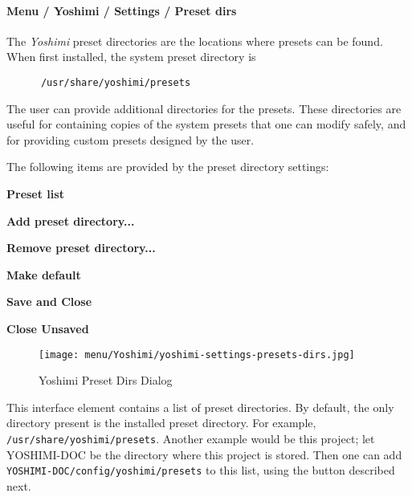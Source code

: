 \paragraph{Menu / Yoshimi / Settings / Preset dirs}
\label{paragraph:menu_yoshimi_settings_preset_dirs}

   The \textsl{Yoshimi} preset directories are the locations where
   presets can be found.  When first installed, the system
   preset directory is

   \begin{verbatim}
      /usr/share/yoshimi/presets
   \end{verbatim}
   
   The user can provide additional directories for the presets.
   These directories are useful for containing copies of the system
   presets that one can modify safely, and for providing custom
   presets designed by the user.

   The following items are provided by the preset directory settings:

   \begin{enumber}
      \item \textbf{Preset list}
      \item \textbf{Add preset directory...}
      \item \textbf{Remove preset directory...}
      \item \textbf{Make default}
      \item \textbf{Save and Close}
      \item \textbf{Close Unsaved}
   \end{enumber}

   \setcounter{ItemCounter}{0}      %

\begin{figure}[H]
   \centering 
   \texttt{[image: menu/Yoshimi/yoshimi-settings-presets-dirs.jpg]}
   \caption[Preset Dirs Tab]{Yoshimi Preset Dirs Dialog}
   \label{fig:yoshimi_presets_dirs_tab}
\end{figure}

   \setcounter{ItemCounter}{0}      %

   This interface element contains a list of preset directories.
   By default, the only directory present is the installed preset directory.
   For example, \texttt{/usr/share/yoshimi/presets}.
   Another example would be this project; let YOSHIMI-DOC be the directory
   where this project is stored.  Then one can add
   \texttt{YOSHIMI-DOC/config/yoshimi/presets} to this list, using the
   button described next.

